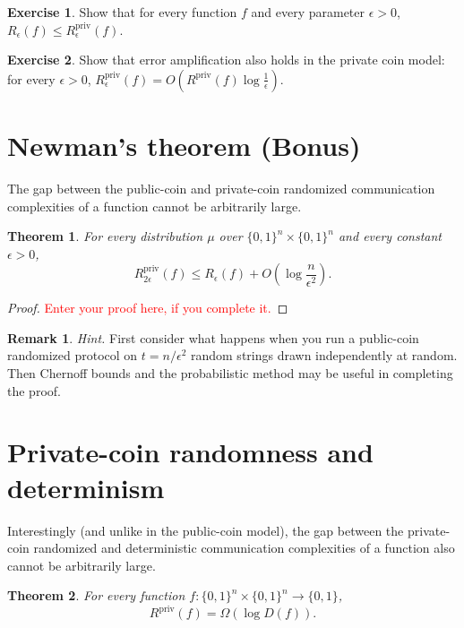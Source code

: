 \documentclass[11pt]{amsart}
\theoremstyle{plain}
\newtheorem{theorem}{Theorem}
\theoremstyle{definition}
\newtheorem{exercise}{Exercise}
\newtheorem{remark}{Remark}
\theoremstyle{plain}
\newcommand{\Rpriv}{R^{\mathrm{priv}}}
\newcommand{\replacethistext}[1]{\textcolor{red}{#1}}
\begin{document}
\begin{exercise}
Show that for every function $f$ and every parameter $\epsilon > 0$, 
$R_\epsilon(f) \le \Rpriv_\epsilon(f)$.
\end{exercise}

\begin{exercise}
Show that error amplification also holds in the private coin model: for every $\epsilon > 0$, $\Rpriv_\epsilon(f) = O(\Rpriv(f) \log \frac1\epsilon)$.
\end{exercise}


\newpage 
\section{Newman's theorem (Bonus)}

The gap between the public-coin and private-coin randomized communication complexities of a function cannot be arbitrarily large. 

\begin{theorem}
For every distribution $\mu$ over $\{0,1\}^n \times \{0,1\}^n$ and every constant $\epsilon > 0$,
\[
\Rpriv_{2\epsilon}(f) \le R_\epsilon(f) + O\left(\log \frac{n}{\epsilon^2}\right).
\]
\end{theorem}

\begin{proof}
\replacethistext{Enter your proof here, if you complete it.}
\end{proof}

\bigskip
\begin{remark}
\emph{Hint.} First consider what happens when you run a public-coin randomized protocol on $t = n/\epsilon^2$ random strings drawn independently at random. Then Chernoff bounds and the probabilistic method may be useful in completing the proof.
\end{remark}


\newpage 
\section{Private-coin randomness and determinism}

Interestingly (and unlike in the public-coin model), the gap between the private-coin randomized and deterministic communication complexities of a function also cannot be arbitrarily large. 

\begin{theorem}
For every function $f : \{0,1\}^n \times \{0,1\}^n \to \{0,1\}$,
\[
\Rpriv(f) = \Omega( \log D(f)).
\]
\end{theorem}
\end{document}
